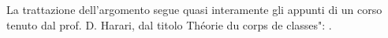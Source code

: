 
La trattazione dell'argomento segue quasi interamente gli appunti di un corso tenuto dal prof. D. Harari, dal titolo \leftquote Théorie du corps de classes": \cite{Harari}.

\vfill\break
